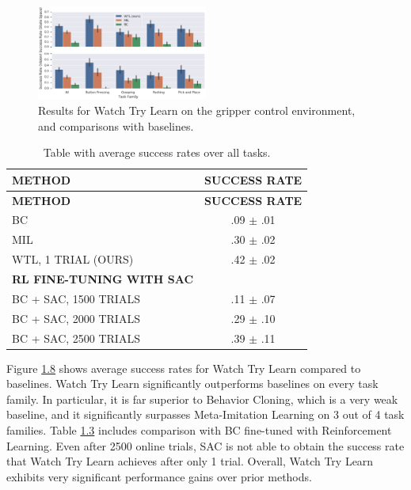 \documentclass[
  letterpaper,
  DIV=11,
  numbers=noendperiod,
  oneside]{scrreprt}
\theoremstyle{remark}
\begin{document}
\begin{figure}

{\centering \includegraphics[width=0.5\textwidth,height=\textheight]{src/Figures/watch-try-learn-results.png}

}

\caption{Results for Watch Try Learn on the gripper control environment,
and comparisons with baselines.}

\end{figure}%

\label{tab:watch-try-learn-table}
\begin{longtable}[]{@{}lc@{}}
\caption{Table with average success rates over all
tasks.}\tabularnewline
\toprule\noalign{}
\textbf{METHOD} & \textbf{SUCCESS RATE} \\
\midrule\noalign{}
\endfirsthead
\toprule\noalign{}
\textbf{METHOD} & \textbf{SUCCESS RATE} \\
\midrule\noalign{}
\endhead
\bottomrule\noalign{}
\endlastfoot
BC & .09 \(\pm\) .01 \\
MIL & .30 \(\pm\) .02 \\
WTL, 1 TRIAL (OURS) & .42 \(\pm\) .02 \\
\textbf{RL FINE-TUNING WITH SAC} & \\
BC + SAC, 1500 TRIALS & .11 \(\pm\) .07 \\
BC + SAC, 2000 TRIALS & .29 \(\pm\) .10 \\
BC + SAC, 2500 TRIALS & .39 \(\pm\) .11 \\
\end{longtable}

Figure \hyperref[fig:watch-try-learn-results]{1.8} shows average success
rates for Watch Try Learn compared to baselines. Watch Try Learn
significantly outperforms baselines on every task family. In particular,
it is far superior to Behavior Cloning, which is a very weak baseline,
and it significantly surpasses Meta-Imitation Learning on 3 out of 4
task families. Table \hyperref[tab:watch-try-learn-table]{1.3} includes
comparison with BC fine-tuned with Reinforcement Learning. Even after
2500 online trials, SAC is not able to obtain the success rate that
Watch Try Learn achieves after only 1 trial. Overall, Watch Try Learn
exhibits very significant performance gains over prior methods.
\end{document}
